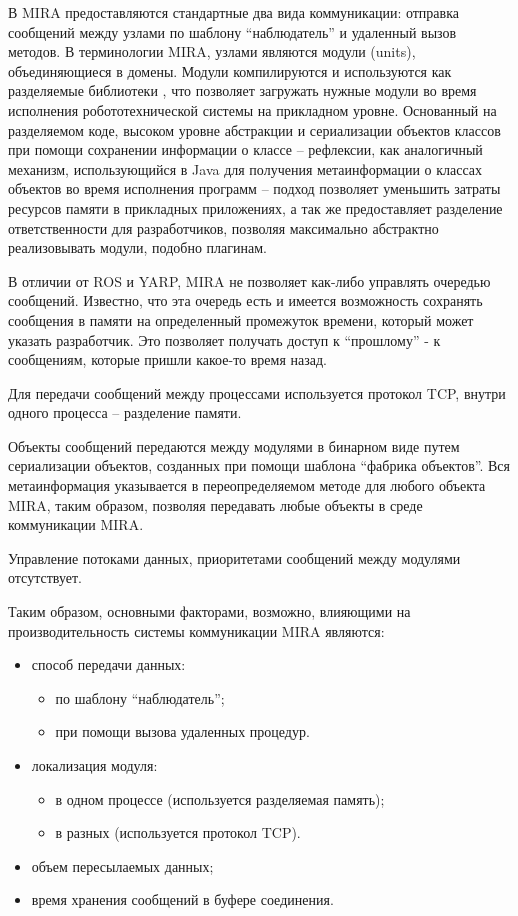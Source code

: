В MIRA предоставляются стандартные два вида коммуникации: отправка сообщений между узлами по шаблону \enquote{наблюдатель} и удаленный вызов методов. В терминологии MIRA, узлами являются модули (units), объединяющиеся в домены. Модули компилируются и используются как разделяемые библиотеки \cite{mira-units}, что позволяет загружать нужные модули во время исполнения робототехнической системы на прикладном уровне. Основанный на разделяемом коде, высоком уровне абстракции и сериализации объектов классов при помощи сохранении информации о классе -- рефлексии, как аналогичный механизм, использующийся в Java для получения метаинформации о классах объектов во время исполнения программ -- подход позволяет уменьшить затраты ресурсов памяти в прикладных приложениях, а так же предоставляет разделение ответственности для разработчиков, позволяя максимально абстрактно реализовывать модули, подобно плагинам. 

В отличии от ROS и YARP, MIRA не позволяет как-либо управлять очередью сообщений. Известно, что эта очередь есть и имеется возможность сохранять сообщения в памяти на определенный промежуток времени, который может указать разработчик. Это позволяет получать доступ к \enquote{прошлому} - к сообщениям, которые пришли какое-то время назад. 

Для передачи сообщений между процессами используется протокол TCP, внутри одного процесса -- разделение памяти.

Объекты сообщений передаются между модулями в бинарном виде путем сериализации объектов, созданных при помощи шаблона \enquote{фабрика объектов}. Вся метаинформация указывается в переопределяемом методе  для любого объекта MIRA, таким образом, позволяя передавать любые объекты в среде коммуникации MIRA.

Управление потоками данных, приоритетами сообщений между модулями отсутствует.

Таким образом, основными факторами, возможно, влияющими на производительность системы коммуникации MIRA являются:
\begin{itemize}[noitemsep]
	\item способ передачи данных:
	\begin{itemize}[noitemsep]
		\item по шаблону \enquote{наблюдатель};
		\item при помощи вызова удаленных процедур.
	\end{itemize}
	\item локализация модуля:
	\begin{itemize}[noitemsep]
		\item в одном процессе (используется разделяемая память);
		\item в разных (используется протокол TCP).
	\end{itemize}
	\item объем пересылаемых данных;
	\item время хранения сообщений в буфере соединения.
\end{itemize}